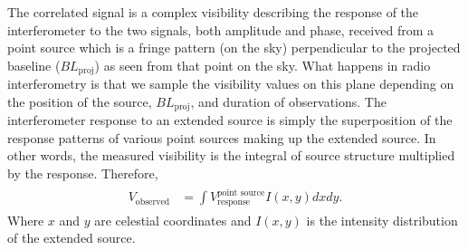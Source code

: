 \documentclass[paper=a4, fontsize=11pt]{scrartcl} %
\numberwithin{equation}{section} %
\numberwithin{figure}{section} %
\numberwithin{table}{section} %
\begin{document}
The correlated signal is a complex visibility describing the response of the interferometer to the two signals, both amplitude and phase, received from a point source which is a fringe pattern (on the sky) perpendicular to the projected baseline ($BL_\mathrm{proj}$) as seen from that point on the sky. What happens in radio interferometry is that we sample the visibility values on this plane depending on the position of the source, $BL_\mathrm{proj}$, and duration of observations. The interferometer response to an extended source is simply the superposition of the response patterns of various point sources making up the extended source. In other words, the measured visibility is the integral of source structure multiplied by the response. Therefore,
\begin{align} 
\begin{split}
V_\mathrm{observed} &= \int V^\text{point source}_\text{response} I(x,y) dx dy.
\end{split}                    
\end{align}
Where $x$ and $y$ are celestial coordinates and $I(x,y)$ is the intensity distribution of the extended source.
\end{document}
